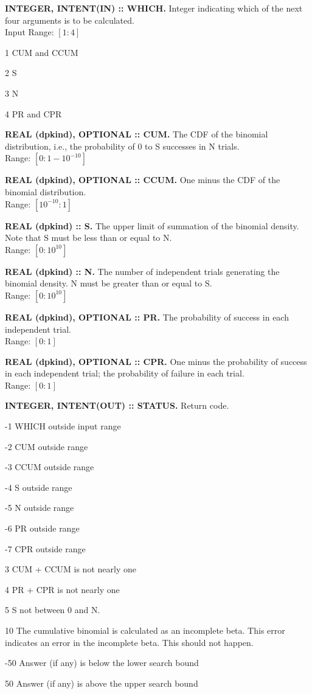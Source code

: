 \documentclass[12pt,dvips]{article}
\newcommand{\range}[2]{\hfill Range: \ensuremath{\left[ #1:#2
\right]}\\}
\newcommand{\inrange}[2]{\hfill Input Range: \ensuremath{\left[ #1:#2
\right]}\\}
\newcommand{\sprob}{10^{-10}}
\newcommand{\bprob}{1-\sprob}
\newcommand{\bbig}{10^10}
\newcommand{\myitem}[1]{\item{\bf \color{Violet} #1 \normalcolor}}
\begin{document}
\begin{description}

\myitem{INTEGER, INTENT(IN)  :: WHICH.} Integer indicating  which of the
next four arguments is to be calculated.\\
\inrange{1}{4}
\begin{description}
\item{1} CUM and CCUM
\item{2} S
\item{3} N
\item{4} PR and CPR
\end{description}

\myitem{REAL (dpkind), OPTIONAL :: CUM.} The CDF of the binomial
distribution,
i.e., the probability of 0 to S successes in N trials.\\
\range{0}{\bprob}

\myitem{REAL (dpkind), OPTIONAL :: CCUM.} One minus the CDF of the
binomial distribution.\\
\range{\sprob}{1}

\myitem{REAL (dpkind) :: S.}  The upper limit of summation of
the binomial density.  Note that S must be less than or equal to N.\\
\range{0}{\bbig}

\myitem{REAL (dpkind) :: N.}  The number of independent trials generating
the binomial density. N must be greater than or equal to S.\\
\range{0}{\bbig}

\myitem{REAL (dpkind),  OPTIONAL :: PR.}  The probability  of success in
each independent trial.\\
\range{0}{1}

\myitem{REAL (dpkind),  OPTIONAL :: CPR.}  One minus  the probability of
success in each independent trial;  the probability of failure in each
trial.\\
\range{0}{1}

\myitem{INTEGER, INTENT(OUT) :: STATUS.} Return code.
\begin{description}
\item{-1}  WHICH outside input range
\item{-2}  CUM outside range
\item{-3}  CCUM outside range
\item{-4}  S outside range
\item{-5}  N outside range
\item{-6}  PR outside range
\item{-7}  CPR outside range
\item{3} CUM + CCUM is not nearly one
\item{4} PR + CPR is not nearly one
\item{5} S not between 0 and N.
\item{10} The cumulative binomial is calculated as an incomplete beta.
This error indicates an error in the incomplete beta.  This should not
happen.   
\item{-50} Answer (if any) is below the lower search bound
\item{50} Answer (if any) is above the upper search bound
\end{description}


\end{description}
\end{document}
